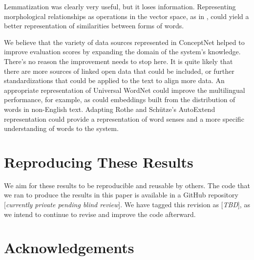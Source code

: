 \documentclass[11pt,letterpaper]{article}
\begin{document}
Lemmatization was clearly very useful, but it loses information. Representing
morphological relationships as operations in the vector space, as in
, could yield a better representation of
similarities between forms of words.

We believe that the variety of data sources represented in ConceptNet helped to
improve evaluation scores by expanding the domain of the system's knowledge.
There's no reason the improvement needs to stop here. It is quite likely that
there are more sources of linked open data that could be included, or further
standardizations that could be applied to the text to align more data. An
appropriate representation of Universal WordNet \cite{demelo2009uwn} could
improve the multilingual performance, for example, as could embeddings built
from the distribution of words in non-English text. Adapting Rothe and
Sch\"{u}tze's AutoExtend representation could provide a representation of word
senses and a more specific understanding of words to the system.

\section{Reproducing These Results}

We aim for these results to be reproducible and reusable by others. The code
that we ran to produce the results in this paper is available in a GitHub
repository [{\em currently private pending blind review}]. We have tagged
this revision as [{\em TBD}], as we intend to continue to revise and improve the
code afterward.

\section*{Acknowledgements}

\begin{CJK*}{UTF8}{min}

\end{CJK*}
\end{document}

